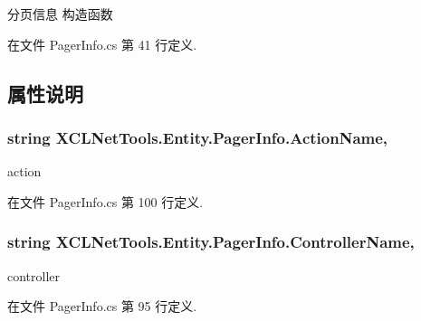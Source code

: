 分页信息 构造函数 



在文件 Pager\-Info.\-cs 第 41 行定义.



\subsection{属性说明}
\hypertarget{class_x_c_l_net_tools_1_1_entity_1_1_pager_info_aa3c26ca4634e5ab5023cc0157e3245b7}{
\subsubsection[{Action\-Name}]{\setlength{\rightskip}{0pt plus 5cm}string X\-C\-L\-Net\-Tools.\-Entity.\-Pager\-Info.\-Action\-Name\hspace{0.3cm}{\ttfamily [get]}, {\ttfamily [set]}}}\label{class_x_c_l_net_tools_1_1_entity_1_1_pager_info_aa3c26ca4634e5ab5023cc0157e3245b7}


action 



在文件 Pager\-Info.\-cs 第 100 行定义.

\hypertarget{class_x_c_l_net_tools_1_1_entity_1_1_pager_info_a7684b1dd21faadcf80c1e2d081660569}{
\subsubsection[{Controller\-Name}]{\setlength{\rightskip}{0pt plus 5cm}string X\-C\-L\-Net\-Tools.\-Entity.\-Pager\-Info.\-Controller\-Name\hspace{0.3cm}{\ttfamily [get]}, {\ttfamily [set]}}}\label{class_x_c_l_net_tools_1_1_entity_1_1_pager_info_a7684b1dd21faadcf80c1e2d081660569}


controller 



在文件 Pager\-Info.\-cs 第 95 行定义.

